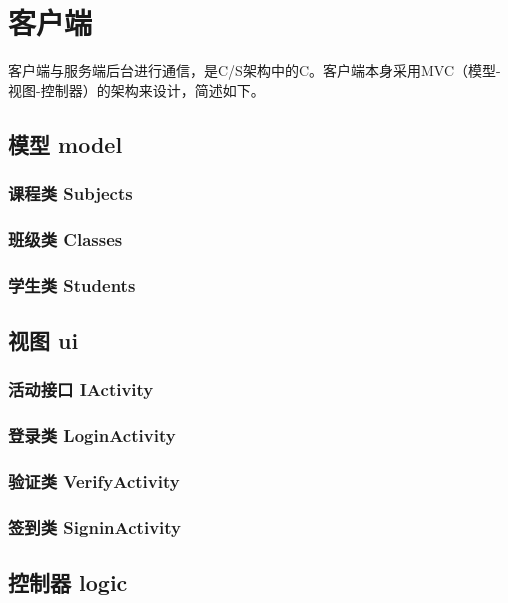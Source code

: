 \documentclass[cs4size,a4paper,nofonts]{ctexart}
\begin{document}
\section{客户端}

客户端与服务端后台进行通信，是C/S架构中的C。客户端本身采用MVC（模型-视图-控制器）的架构来设计，简述如下。

\subsection{模型 model}

\subsubsection{课程类 Subjects}

\subsubsection{班级类 Classes}

\subsubsection{学生类 Students}

\subsection{视图 ui}

\subsubsection{活动接口 IActivity}

\subsubsection{登录类 LoginActivity}

\subsubsection{验证类 VerifyActivity}

\subsubsection{签到类 SigninActivity}

\subsection{控制器 logic}
\end{document}
